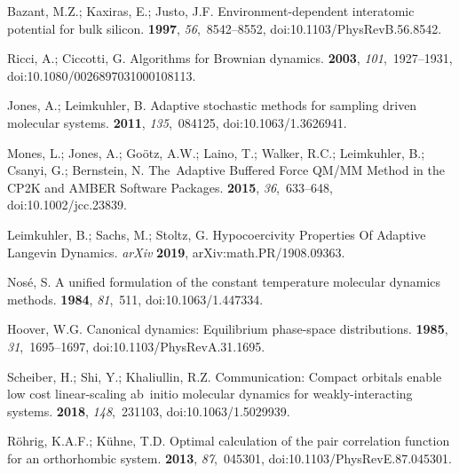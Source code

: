 \documentclass[computation,article,accept,moreauthors,pdftex]{Definitions/mdpi}
\begin{document}
\begin{thebibliography}{999}
Bazant, M.Z.; Kaxiras, E.; Justo, J.F.
\newblock Environment-dependent interatomic potential for bulk silicon.
 {\bf 1997}, {\em 56},~8542--8552, doi:10.1103/PhysRevB.56.8542.

Ricci, A.; Ciccotti, G.
\newblock Algorithms for Brownian dynamics.
 {\bf 2003}, {\em 101},~1927--1931, doi:10.1080/0026897031000108113.

Jones, A.; Leimkuhler, B.
\newblock Adaptive stochastic methods for sampling driven molecular systems.
 {\bf 2011}, {\em 135},~084125, doi:10.1063/1.3626941.

Mones, L.; Jones, A.; Go\"otz, A.W.; Laino, T.; Walker, R.C.; Leimkuhler, B.;
 Csanyi, G.; Bernstein, N.
\newblock The~Adaptive Buffered Force QM/MM Method in the CP2K and AMBER
 Software Packages.
 {\bf 2015}, {\em 36},~633--648, doi:10.1002/jcc.23839.

Leimkuhler, B.; Sachs, M.; Stoltz, G.
\newblock Hypocoercivity Properties Of Adaptive Langevin Dynamics. \emph{arXiv} {\bf 2019}, 
arXiv:math.PR/1908.09363.

Nos\'e, S.
\newblock A unified formulation of the constant temperature molecular dynamics
 methods.
 {\bf 1984}, {\em 81},~511, doi:10.1063/1.447334.

Hoover, W.G.
\newblock Canonical dynamics: Equilibrium phase-space distributions.
 {\bf 1985}, {\em 31},~1695--1697, doi:10.1103/PhysRevA.31.1695.

Scheiber, H.; Shi, Y.; Khaliullin, R.Z.
\newblock Communication: Compact orbitals enable low cost linear-scaling ab~initio molecular dynamics for weakly-interacting systems.
 {\bf 2018}, {\em 148},~231103, doi:10.1063/1.5029939.

R\"ohrig, K.A.F.; K\"uhne, T.D.
\newblock Optimal calculation of the pair correlation function for an
 orthorhombic system.
 {\bf 2013}, {\em 87},~045301, doi:10.1103/PhysRevE.87.045301.


\end{thebibliography}
\end{document}
